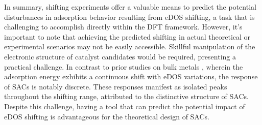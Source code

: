 In summary, shifting experiments offer a valuable means to predict the potential disturbances in adsorption behavior resulting from eDOS shifting, a task that is challenging to accomplish directly within the DFT framework.
However, it's important to note that achieving the predicted shifting in actual theoretical or experimental scenarios may not be easily accessible.
Skillful manipulation of the electronic structure of catalyst candidates would be required, presenting a practical challenge. In contrast to prior studies on bulk metals \cite{fung2021machine}, wherein the adsorption energy exhibits a continuous shift with eDOS variations, the response of SACs is notably discrete.
These responses manifest as isolated peaks throughout the shifting range, attributed to the distinctive structure of SACs.
Despite this challenge, having a tool that can predict the potential impact of eDOS shifting is advantageous for the theoretical design of SACs.
